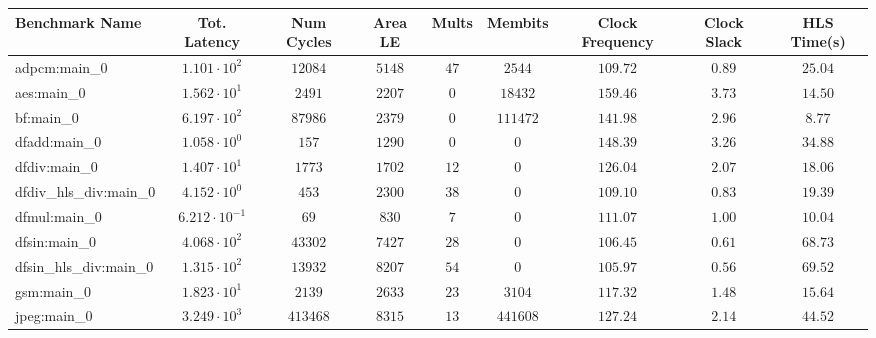 \begin{tabular}{|l|c|c|c|c|c|c|c|c|}
\hline
Benchmark Name          & Tot. Latency            & Num Cycles & Area LE   & Mults   & Membits    & Clock Frequency & Clock Slack & HLS Time(s) \\
\hline
adpcm:main\_0           & $ 1.101 \cdot 10^{2}  $ & $ 12084  $ & $ 5148  $ & $ 47  $ & $ 2544   $ & $ 109.72      $ & $ 0.89    $ & $ 25.04   $ \\
aes:main\_0             & $ 1.562 \cdot 10^{1}  $ & $ 2491   $ & $ 2207  $ & $ 0   $ & $ 18432  $ & $ 159.46      $ & $ 3.73    $ & $ 14.50   $ \\
bf:main\_0              & $ 6.197 \cdot 10^{2}  $ & $ 87986  $ & $ 2379  $ & $ 0   $ & $ 111472 $ & $ 141.98      $ & $ 2.96    $ & $ 8.77    $ \\
dfadd:main\_0           & $ 1.058 \cdot 10^{0}  $ & $ 157    $ & $ 1290  $ & $ 0   $ & $ 0      $ & $ 148.39      $ & $ 3.26    $ & $ 34.88   $ \\
dfdiv:main\_0           & $ 1.407 \cdot 10^{1}  $ & $ 1773   $ & $ 1702  $ & $ 12  $ & $ 0      $ & $ 126.04      $ & $ 2.07    $ & $ 18.06   $ \\
dfdiv\_hls\_div:main\_0 & $ 4.152 \cdot 10^{0}  $ & $ 453    $ & $ 2300  $ & $ 38  $ & $ 0      $ & $ 109.10      $ & $ 0.83    $ & $ 19.39   $ \\
dfmul:main\_0           & $ 6.212 \cdot 10^{-1} $ & $ 69     $ & $ 830   $ & $ 7   $ & $ 0      $ & $ 111.07      $ & $ 1.00    $ & $ 10.04   $ \\
dfsin:main\_0           & $ 4.068 \cdot 10^{2}  $ & $ 43302  $ & $ 7427  $ & $ 28  $ & $ 0      $ & $ 106.45      $ & $ 0.61    $ & $ 68.73   $ \\
dfsin\_hls\_div:main\_0 & $ 1.315 \cdot 10^{2}  $ & $ 13932  $ & $ 8207  $ & $ 54  $ & $ 0      $ & $ 105.97      $ & $ 0.56    $ & $ 69.52   $ \\
gsm:main\_0             & $ 1.823 \cdot 10^{1}  $ & $ 2139   $ & $ 2633  $ & $ 23  $ & $ 3104   $ & $ 117.32      $ & $ 1.48    $ & $ 15.64   $ \\
jpeg:main\_0            & $ 3.249 \cdot 10^{3}  $ & $ 413468 $ & $ 8315  $ & $ 13  $ & $ 441608 $ & $ 127.24      $ & $ 2.14    $ & $ 44.52   $ \\

\end{tabular}
